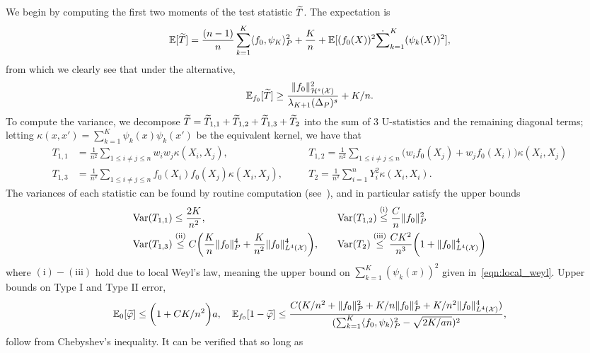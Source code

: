We begin by computing the first two moments of the test statistic $\widetilde{T}$. The expectation is
\begin{align*}
\mathbb{E}[\widetilde{T}] = \frac{(n - 1)}{n} \sum_{k = 1}^{K} \langle f_0, \psi_K \rangle_P^2 + \frac{K}{n} + \mathbb{E}[(f_0(X))^2 \dot \sum_{k = 1}^{K} (\psi_k(X))^2],
\end{align*}
from which we clearly see that under the alternative,
\begin{equation*}
\mathbb{E}_{f_0}[\widetilde{T}] \geq \frac{\|f_0\|_{\mathcal{H}^s(\mathcal{X})}^2}{\lambda_{K + 1}(\Delta_{P})^s} + K/n.
\end{equation*}
To compute the variance, we decompose $\widetilde{T} = \widetilde{T}_{1,1} + \widetilde{T}_{1,2} + \widetilde{T}_{1,3} + \widetilde{T}_2$ into the sum of 3 U-statistics and the remaining diagonal terms; letting $\kappa(x,x') = \sum_{k = 1}^{K} \psi_k(x) \psi_k(x')$ be the equivalent kernel, we have that
\begin{align*}
T_{1,1} & = \frac{1}{n^2} \sum_{1 \leq i \neq j \leq n} w_i w_j \kappa(X_i,X_j),\quad && T_{1,2} = \frac{1}{n^2} \sum_{1 \leq i \neq j \leq n} \bigl(w_i f_0(X_j) + w_jf_0(X_i)\bigr)\kappa(X_i,X_j) \\
T_{1,3} & = \frac{1}{n^2} \sum_{1 \leq i \neq j \leq n} f_0(X_i) f_0(X_j) \kappa(X_i,X_j), \quad && T_2 = \frac{1}{n^2} \sum_{i = 1}^{n} Y_i^2 \kappa(X_i,X_i).
\end{align*}
The variances of each statistic can be found by routine computation (see~\cite{ingster2009}), and in particular satisfy the upper bounds
\begin{align*}
\mathrm{Var}(T_{1,1}) & \leq \frac{2K}{n^2}, \quad && \mathrm{Var}(T_{1,2}) \overset{\mathrm{(i)}}{\leq} \frac{C}{n}\|f_0\|_P^2\\
\mathrm{Var}(T_{1,3}) & \overset{\mathrm{(ii)}}{\leq} C\biggl(\frac{K}{n}\|f_0\|_P^4 + \frac{K}{n^2}\|f_0\|_{L^4(\mathcal{X})}^4\biggr), \quad && \mathrm{Var}(T_{2}) \overset{\mathrm{(iii)}}{\leq} \frac{CK^2}{n^3}\biggl(1 + \|f_0\|_{L^4(\mathcal{X})}^4\biggr)
\end{align*}
where $\mathrm{(i)}-\mathrm{(iii)}$ hold due to local Weyl's law, meaning the upper bound on $\sum_{k = 1}^{K} (\psi_k(x))^2$ given in~\eqref{eqn:local_weyl}. Upper bounds on Type I and Type II error,
\begin{equation*}
\mathbb{E}_0[\widetilde{\varphi}] \leq \biggl(1 + CK/n^2\biggr)a, \quad \mathbb{E}_{f_0}[1 - \widetilde{\varphi}] \leq \frac{C(K/n^2 + \|f_0\|_P^2 + K/n \|f_0\|_P^4 + K/n^2 \|f_0\|_{L^4(\mathcal{X})}^4)}{(\sum_{k = 1}^{K} \langle f_0, \psi_k \rangle_P^2 - \sqrt{2K/an})^2},
\end{equation*}
follow from Chebyshev's inequality. It can be verified that so long as
